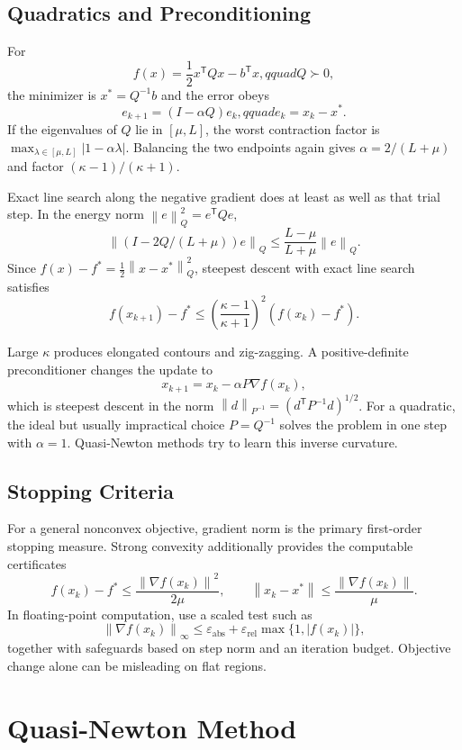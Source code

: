 \documentclass[12pt,oneside]{book}
\numberwithin{equation}{section}
\theoremstyle{definition}
\theoremstyle{plain}
\theoremstyle{remark}
\newcommand{\norm}[1]{\left\lVert #1 \right\rVert}
\newcommand{\grad}{\nabla}
\begin{document}
\subsection{Quadratics and Preconditioning}

For
\[
 f(x)=\frac12x^\mathsf TQx-b^\mathsf Tx,qquad Q\succ0,
\]
the minimizer is $x^*=Q^{-1}b$ and the error obeys
\[
 e_{k+1}=(I-\alpha Q)e_k,qquad e_k=x_k-x^*.
\]
If the eigenvalues of $Q$ lie in $[\mu,L]$, the worst contraction factor is
$\max_{\lambda\in[\mu,L]}|1-\alpha\lambda|$. Balancing the two endpoints
again gives $\alpha=2/(L+\mu)$ and factor $(\kappa-1)/(\kappa+1)$.

Exact line search along the negative gradient does at least as well as that
trial step. In the energy norm $\norm e_Q^2=e^\mathsf TQe$,
\[
 \norm{(I-2Q/(L+\mu))e}_Q
 \leq\frac{L-\mu}{L+\mu}\norm e_Q.
\]
Since $f(x)-f^*=\tfrac12\norm{x-x^*}_Q^2$, steepest descent with exact line
search satisfies
\[
 f(x_{k+1})-f^*
 \leq\left(\frac{\kappa-1}{\kappa+1}\right)^2
       (f(x_k)-f^*).
\]

Large $\kappa$ produces elongated contours and zig-zagging. A positive-definite
preconditioner changes the update to
\[
 x_{k+1}=x_k-\alpha P\grad f(x_k),
\]
which is steepest descent in the norm
$\norm d_{P^{-1}}=(d^\mathsf TP^{-1}d)^{1/2}$. For a quadratic, the ideal but
usually impractical choice $P=Q^{-1}$ solves the problem in one step with
$\alpha=1$. Quasi-Newton methods try to learn this inverse curvature.

\subsection{Stopping Criteria}

For a general nonconvex objective, gradient norm is the primary first-order
stopping measure. Strong convexity additionally provides the computable
certificates
\[
 f(x_k)-f^*\leq\frac{\norm{\grad f(x_k)}^2}{2\mu},
 \qquad
 \norm{x_k-x^*}\leq\frac{\norm{\grad f(x_k)}}{\mu}.
\]
In floating-point computation, use a scaled test such as
\[
 \norm{\grad f(x_k)}_\infty
 \leq\varepsilon_{\mathrm{abs}}
 +\varepsilon_{\mathrm{rel}}\max\{1,|f(x_k)|\},
\]
together with safeguards based on step norm and an iteration budget. Objective
change alone can be misleading on flat regions.

\section{Quasi-Newton Method}
\end{document}

